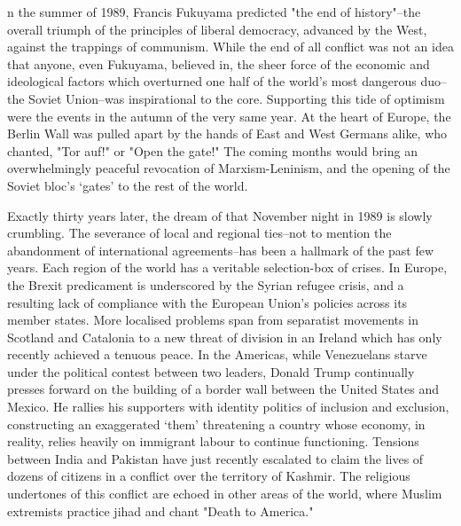 \label{ch:open-the-gate}

n the summer of 1989, Francis Fukuyama predicted "the end of
   history"--the overall triumph of the principles of liberal democracy,
   advanced by the West, against the trappings of communism. While the end
   of all conflict was not an idea that anyone, even Fukuyama, believed
   in, the sheer force of the economic and ideological factors which
   overturned one half of the world's most dangerous duo--the Soviet
   Union--was inspirational to the core. Supporting this tide of optimism
   were the events in the autumn of the very same year. At the heart of
   Europe, the Berlin Wall was pulled apart by the hands of East and West
   Germans alike, who chanted, "Tor auf!" or "Open the gate!" The coming
   months would bring an overwhelmingly peaceful revocation of
   Marxism-Leninism, and the opening of the Soviet bloc's `gates' to the
   rest of the world.

   Exactly thirty years later, the dream of that November night in 1989 is
   slowly crumbling. The severance of local and regional ties--not to
   mention the abandonment of international agreements--has been a
   hallmark of the past few years. Each region of the world has a
   veritable selection-box of crises. In Europe, the Brexit predicament is
   underscored by the Syrian refugee crisis, and a resulting lack of
   compliance with the European Union's policies across its member states.
   More localised problems span from separatist movements in Scotland and
   Catalonia to a new threat of division in an Ireland which has only
   recently achieved a tenuous peace. In the Americas, while Venezuelans
   starve under the political contest between two leaders, Donald Trump
   continually presses forward on the building of a border wall between
   the United States and Mexico. He rallies his supporters with identity
   politics of inclusion and exclusion, constructing an exaggerated `them'
   threatening a country whose economy, in reality, relies heavily on
   immigrant labour to continue functioning. Tensions between India and
   Pakistan have just recently escalated to claim the lives of dozens of
   citizens in a conflict over the territory of Kashmir. The religious
   undertones of this conflict are echoed in other areas of the world,
   where Muslim extremists practice jihad and chant "Death to America."

